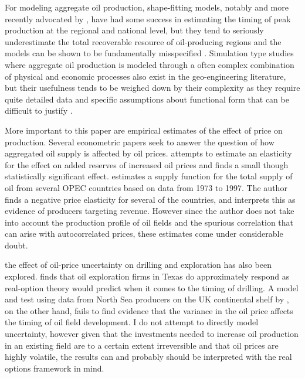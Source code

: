 \documentclass[12pt]{article}
\begin{document}
For modeling aggregate oil production, shape-fitting models, notably \citet{hubbert_energy_1962} and more recently advocated by \citet{deffeyes_hubberts_2001}, have had some success in estimating the timing of peak production at the regional and national level, but they tend to seriously underestimate the total recoverable resource of oil-producing regions and the models can be shown to be fundamentally misspecified \citep{boyce_prediction_2013}.   Simulation type studies where aggregate oil production is modeled through a often complex combination of physical and economic processes also exist in the geo-engineering literature, but their usefulness tends to be weighed down by their complexity as they require quite detailed data and specific assumptions about functional form that can be difficult to justify \citet{brandt_review_2010}.

More important to this paper are empirical estimates of the effect of price on production. Several econometric papers seek to answer the question of how aggregated oil supply is affected by oil prices.  \citet{farzin_impact_2001} attempts to estimate an elasticity for the effect on added reserves of increased oil prices and finds a small though statistically significant effect.  \citet{ramcharran_oil_2002} estimates a supply function for the total supply of oil from several OPEC countries based on data from 1973 to 1997.  The author finds a negative price elasticity for several of the countries, and interprets this as evidence of producers targeting revenue.  However since the author does not take into account the production profile of oil fields and the spurious correlation that can arise with autocorrelated prices, these estimates come under considerable doubt.  

the effect of oil-price uncertainty on drilling and exploration has also been explored.  \citet{kellogg_effect_2010} finds that oil exploration firms in Texas do approximately respond as real-option theory would predict when it comes to the timing of drilling.  A model and test using data from North Sea producers on the UK continental shelf by \citet{hurn_geology_1994}, on the other hand, fails to find evidence that the variance in the oil price affects the timing of oil field development.  I do not attempt to directly model uncertainty, however given that the investments needed to increase oil production in an existing field are to a certain extent irreversible and that oil prices are highly volatile, the results can and probably should be interpreted with the real options framework in mind.  
\end{document}
